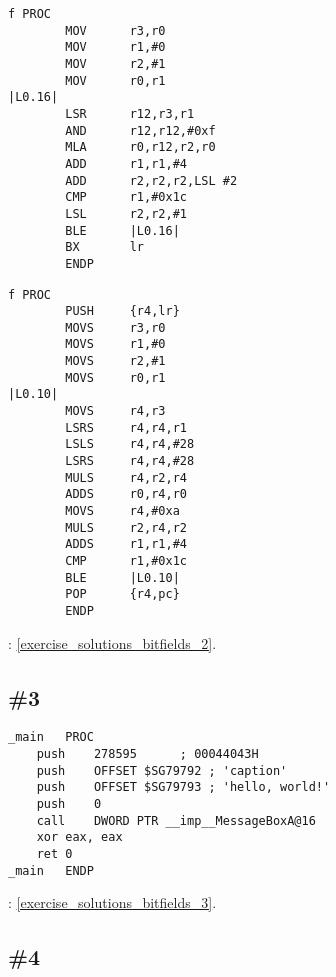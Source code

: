 \begin{lstlisting}[caption=\OptimizingKeilVI (\ARMMode)]
f PROC
        MOV      r3,r0
        MOV      r1,#0
        MOV      r2,#1
        MOV      r0,r1
|L0.16|
        LSR      r12,r3,r1
        AND      r12,r12,#0xf
        MLA      r0,r12,r2,r0
        ADD      r1,r1,#4
        ADD      r2,r2,r2,LSL #2
        CMP      r1,#0x1c
        LSL      r2,r2,#1
        BLE      |L0.16|
        BX       lr
        ENDP
\end{lstlisting}

\begin{lstlisting}[caption=\OptimizingKeilVI (\ThumbMode)]
f PROC
        PUSH     {r4,lr}
        MOVS     r3,r0
        MOVS     r1,#0
        MOVS     r2,#1
        MOVS     r0,r1
|L0.10|
        MOVS     r4,r3
        LSRS     r4,r4,r1
        LSLS     r4,r4,#28
        LSRS     r4,r4,#28
        MULS     r4,r2,r4
        ADDS     r0,r4,r0
        MOVS     r4,#0xa
        MULS     r2,r4,r2
        ADDS     r1,r1,#4
        CMP      r1,#0x1c
        BLE      |L0.10|
        POP      {r4,pc}
        ENDP
\end{lstlisting}

\Answer{}: \ref{exercise_solutions_bitfields_2}.

\subsection{\Exercise \#3}
\label{exercise_bitfields_3}


\begin{lstlisting}[caption=\Optimizing MSVC 2010]
_main	PROC
	push	278595		; 00044043H
	push	OFFSET $SG79792 ; 'caption'
	push	OFFSET $SG79793 ; 'hello, world!'
	push	0
	call	DWORD PTR __imp__MessageBoxA@16
	xor	eax, eax
	ret	0
_main	ENDP
\end{lstlisting}

\Answer{}: \ref{exercise_solutions_bitfields_3}.

\subsection{\Exercise \#4}
\label{exercise_bitfields_4}

\WhatThisCodeDoes\

